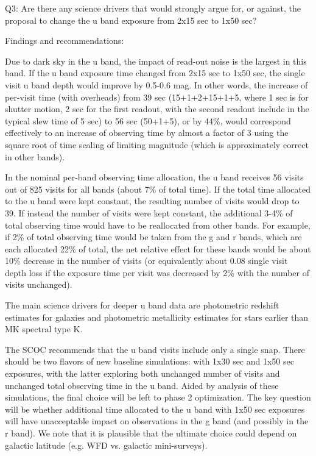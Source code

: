 Q3:  Are there any science drivers that would strongly argue for, or against, the proposal to 
change the u band exposure from 2x15 sec to 1x50 sec? 

Findings and recommendations:

Due to dark sky in the u band, the impact of read-out noise is the largest in this band. If 
the u band exposure time changed from 2x15 sec to 1x50 sec, the single visit u band depth 
would improve by 0.5-0.6 mag. In other words, the increase of per-visit time (with overheads) from 39 sec (15+1+2+15+1+5, where 1 sec is for shutter motion, 2 sec for the first readout, with the second readout include in the typical slew time of 5 sec) to 56 sec (50+1+5), or by 44\%, would correspond effectively to an increase of observing time by almost a factor of 3 using the square root of time scaling of limiting magnitude (which is approximately correct in other bands). 

In the nominal per-band observing time allocation, the u band receives 56 visits out of 825 visits for all bands (about 7\% of total time). If the total time allocated to the u band were kept constant, the resulting number of visits would drop to 39. If instead the number of visits were kept constant, the additional 3-4\% of total observing time would have to be reallocated from other bands. For example, if 2\% of total observing time would be taken from the g and r bands, which are each allocated 22\% of total, the net relative effect for these bands would be about 10\% decrease in the number of visits (or equivalently about 0.08 single visit depth loss if the exposure time per visit was decreased by 2\% with the number of visits unchanged). 

The main science drivers for deeper u band data are photometric redshift estimates for
galaxies and photometric metallicity estimates for stars earlier than MK spectral type K. 

The SCOC recommends that the u band visits include only a single snap. There should be two flavors of new baseline simulations: with 1x30 sec and 1x50 sec exposures, with the latter exploring both unchanged number of visits and unchanged total observing time in the u band. Aided by analysis of these simulations, the final choice will be left to phase 2 optimization. The key question will be whether additional time allocated to the u band with 1x50 sec exposures will have unacceptable impact on observations in the g band (and possibly in the r band). We note that it is plausible that the ultimate choice could depend on galactic latitude (e.g. WFD vs. galactic mini-surveys). 
 

